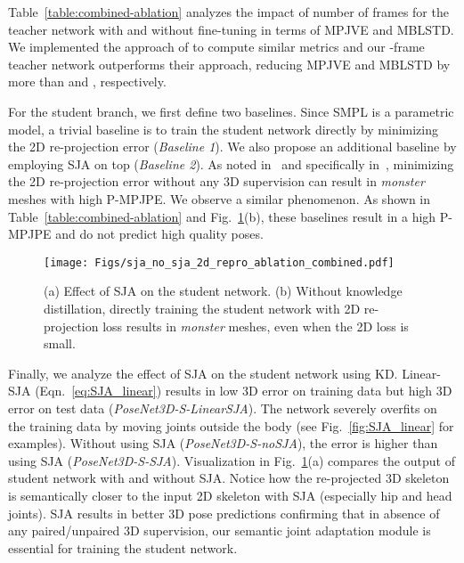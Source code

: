 \documentclass[10pt,twocolumn,letterpaper]{article}
\begin{document}
 
Table~\ref{table:combined-ablation} analyzes the impact of number of frames for the teacher network with and without fine-tuning in terms of MPJVE and MBLSTD. We implemented the approach of \cite{chingCVPR2019} to compute similar metrics and our -frame teacher network outperforms their approach, reducing MPJVE and MBLSTD by more than  and , respectively.

For the student branch, we first define two baselines. Since SMPL is a parametric model, a trivial baseline is to train the student network directly by minimizing the 2D re-projection error (\textit{Baseline 1}). We also propose an additional baseline by employing SJA on top (\textit{Baseline 2}). As noted in~\cite{arnab2019exploiting} and specifically in~\cite{kanazawa2018end}, minimizing the 2D re-projection error without any 3D supervision can result in \textit{monster} meshes with high P-MPJPE. We observe a similar phenomenon. As shown in Table~\ref{table:combined-ablation} and Fig.~\ref{fig:sja_no_sja_2d_repro_ablation_combined}(b), these baselines result in a high P-MPJPE and do not predict high quality poses.


\begin{figure}[t!]
		\centering
		\texttt{[image: Figs/sja\_no\_sja\_2d\_repro\_ablation\_combined.pdf]}
		\vspace{-2ex}
		\caption{(a) Effect of SJA on the student network. (b) Without knowledge distillation, directly training the student network with 2D re-projection loss results in \textit{monster} meshes, even when the 2D loss is small. 
		}
		\label{fig:sja_no_sja_2d_repro_ablation_combined}
	\vspace{-3ex}
\end{figure}



Finally, we analyze the effect of SJA on the student network using KD. Linear-SJA (Eqn.~\ref{eq:SJA_linear}) results in low 3D error on training data but high 3D error on test data (\textit{PoseNet3D-S-LinearSJA}). The network severely overfits on the training data by moving joints outside the body (see Fig.~\ref{fig:SJA_linear} for examples). Without using SJA (\textit{PoseNet3D-S-noSJA}), the error is higher than using SJA (\textit{PoseNet3D-S-SJA}). Visualization in Fig.~\ref{fig:sja_no_sja_2d_repro_ablation_combined}(a) compares the output of student network with and without SJA. Notice how the re-projected 3D skeleton is semantically closer to the input 2D skeleton with SJA (especially hip and head joints). SJA results in better 3D pose predictions confirming that in absence of any paired/unpaired 3D supervision, our semantic joint adaptation module is essential for training the student network.
\end{document}
